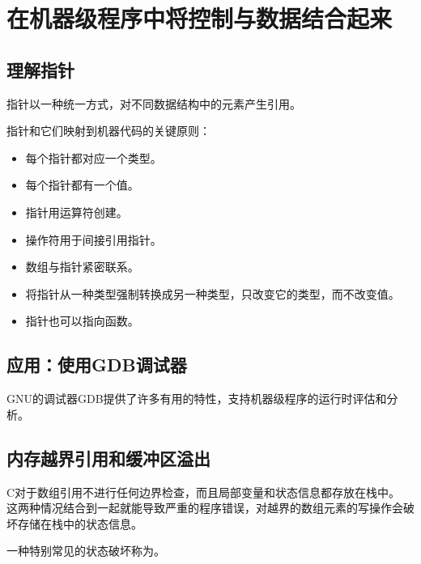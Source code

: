
\section{在机器级程序中将控制与数据结合起来}
{
    \subsection{理解指针}
    {
        指针以一种统一方式，对不同数据结构中的元素产生引用。

        指针和它们映射到机器代码的关键原则：

        \begin{itemize}
            \item 每个指针都对应一个类型。
            \item 每个指针都有一个值。
            \item 指针用\emcode{\&{}}运算符创建。
            \item \emcode{*}操作符用于间接引用指针。
            \item 数组与指针紧密联系。
            \item 将指针从一种类型强制转换成另一种类型，只改变它的类型，而不改变值。
            \item 指针也可以指向函数。
        \end{itemize}
    }

    \subsection{应用：使用GDB调试器}
    {
        GNU的调试器GDB提供了许多有用的特性，支持机器级程序的运行时评估和分析。
    }

    \subsection{内存越界引用和缓冲区溢出}
    {
        C对于数组引用不进行任何边界检查，而且局部变量和状态信息都存放在栈中。
        这两种情况结合到一起就能导致严重的程序错误，对越界的数组元素的写操作会破坏存储在栈中的状态信息。

        一种特别常见的状态破坏称为。

}}
